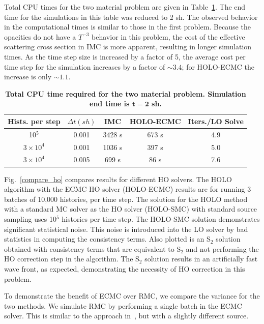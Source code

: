 \documentclass{mc2013}
\begin{document}
Total CPU times for the two material problem are given in Table~\ref{twomat_table}. The end time for the simulations in this table was reduced to 2 sh.  The observed behavior in the computational times is similar to those
in the first problem.  Because the opacities do not have a $T^{-3}$ behavior in this problem, the cost of the effective scattering cross section in IMC is more apparent, resulting in longer simulation times.  As the time step size is increased by a factor of 5, the average cost per time step for the simulation increases by a factor of $\sim3.4$; for HOLO-ECMC the increase is only $\sim1.1$.   
\begin{table}[htb!]
\centering
\caption{\label{twomat_table} \textbf{Total CPU time required for the two material problem.  Simulation end time is $\mathbf{t=2}$ sh.}}
	\begin{tabular}{|cc|c|cc|} \hline
Hists. per step & $\Delta t (sh)$ & IMC & HOLO-ECMC  &  Iters./LO Solve\\ \hline
10$^5$                    &   0.001	& 3428 s  &	673 s & 4.9 \\
$3\times10^4 $   &    0.001	& 1036 s  &	397 s  &    5.0 \\
$3\times10^4$     &   0.005	&  699 s  &  86 s  &    7.6 \\ \hline
\end{tabular}
\end{table}



Fig.~\ref{compare_ho} compares results for different HO solvers.  The HOLO algorithm
with the ECMC HO solver (HOLO-ECMC) results
are for running 3 batches of 10,000 histories, per time step. The solution for the HOLO method with a standard MC solver as the HO solver
(HOLO-SMC) with standard source sampling uses 10$^5$ histories per time step. The HOLO-SMC solution demonstrates significant
statistical noise.  This noise is introduced into the LO solver by bad statistics in
computing the consistency terms. Also
plotted is an S$_2$ solution obtained with consistency terms that are equivalent
to S$_2$ and not performing the HO correction step in the algorithm.  The S$_2$ solution results in an artificially fast
wave front, as expected, demonstrating the necessity of HO correction in this problem.


To demonstrate the benefit of ECMC over RMC, we compare the variance for the two
methods. We simulate RMC by performing a single batch in the ECMC solver.  This is
similar to the approach in~\cite{rmc}, but with a slightly different source.
\end{document}
